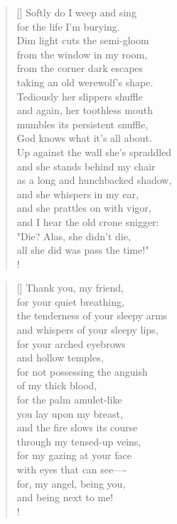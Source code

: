\documentclass[]{article}
\begin{document}
\settowidth{\versewidth}{from the corner dark escapes }
\begin{verse}[\versewidth]
Softly do I weep and sing\\
for the life I'm burying.\\
Dim light cuts the semi-gloom\\
from the window in my room,\\
from the corner dark escapes\\
taking an old werewolf's shape.\\
Tediously her slippers shuffle\\
and again, her toothless mouth\\
mumbles its persistent snuffle,\\
God knows what it's all about.\\
Up against the wall she's spraddled\\
and she stands behind my chair\\
as a long and hunchbacked shadow,\\
and she whispers in my ear,\\
and she prattles on with vigor,\\
and I hear the old crone snigger:\\
"Die? Alas, she didn't die,\\
all she did was pass the time!"\\!
\end{verse}
\newpage 

\vspace*{0.05\textheight}
\settowidth{\versewidth}{Thank you, my friend  }
\begin{verse}[\versewidth]
Thank you, my friend,\\
for your quiet breathing,\\
the tenderness of your sleepy arms\\
and whispers of your sleepy lips,\\
for your arched eyebrows\\
and hollow temples,\\
for not possessing the anguish\\
of my thick blood,\\
for the palm amulet-like\\
you lay upon my breast,\\
and the fire slows its course\\
through my tensed-up veins,\\
for my gazing at your face\\
with eyes that can see—-\\
for, my angel, being you,\\
and being next to me!\\!
\end{verse}
\bigskip \bigskip
\end{document}
